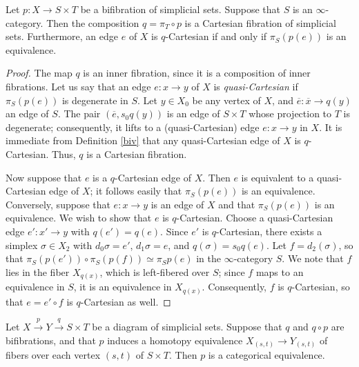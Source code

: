\begin{lemma}\label{gork}
Let $p: X \rightarrow S \times T$ be a bifibration of simplicial sets. Suppose that
$S$ is an $\infty$-category. Then the composition $q=\pi_{T} \circ p$ is a Cartesian fibration of simplicial sets. Furthermore, an edge $e$ of $X$ is $q$-Cartesian if and only if
$\pi_{S}(p(e))$ is an equivalence.
\end{lemma}

\begin{proof}
The map $q$ is an inner fibration, since it is a composition of inner fibrations. Let us say that an edge $e: x \rightarrow y$ of $X$ is {\it quasi-Cartesian} if $\pi_S(p(e))$ is degenerate in $S$. 
Let $y \in X_0$ be any vertex of $X$, and $\overline{e}: \overline{x} \rightarrow q(y)$ an edge of $S$. The pair $(\overline{e}, s_0 q(y))$ is an edge of $S \times T$ whose projection to $T$ is degenerate; consequently, it lifts to a (quasi-Cartesian) edge $e: x \rightarrow y$ in $X$. It is immediate from Definition \ref{biv} that any quasi-Cartesian edge of $X$ is $q$-Cartesian. Thus, $q$ is a Cartesian fibration.

Now suppose that $e$ is a $q$-Cartesian edge of $X$. Then $e$ is equivalent to a quasi-Cartesian edge of $X$; it follows easily that $\pi_{S}(p(e))$ is an equivalence. Conversely, suppose that $e: x \rightarrow y$ is an edge of $X$ and that $\pi_{S}(p(e))$ is an equivalence. We wish to show that $e$ is $q$-Cartesian. Choose a quasi-Cartesian edge
$e': x' \rightarrow y$ with $q(e')=q(e)$. Since $e'$ is $q$-Cartesian, there exists a simplex $\sigma \in X_2$ with $d_0 \sigma = e'$, $d_1 \sigma = e$, and $q(\sigma) = s_0 q(e)$. Let $f = d_2(\sigma)$, so that $\pi_S (p(e')) \circ  \pi_{S} (p(f)) \simeq \pi_S p(e)$ in the $\infty$-category $S$. We note that $f$ lies in the fiber $X_{q(x)}$, which is left-fibered over $S$; since $f$ maps to an equivalence in $S$, it is an equivalence in $X_{q(x)}$. Consequently, $f$ is $q$-Cartesian, so that
$e = e' \circ f$ is $q$-Cartesian as well.
\end{proof}

\begin{proposition}\label{equivbifib}
Let $X \stackrel{p}{\rightarrow} Y \stackrel{q}{\rightarrow} S \times T$ be a diagram of simplicial sets.
Suppose that $q$ and $q \circ p$ are bifibrations, and that $p$ induces a homotopy equivalence $X_{(s,t)} \rightarrow Y_{(s,t)}$ of fibers over each vertex $(s,t)$ of $S \times T$. Then $p$ is a categorical equivalence.
\end{proposition}


